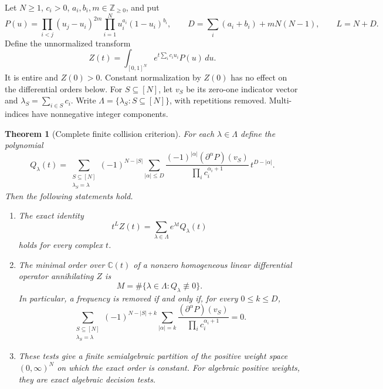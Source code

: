 \documentclass[11pt,a4paper]{article}
\newtheorem{theorem}{Theorem}[section]
\theoremstyle{definition}
\theoremstyle{remark}
\numberwithin{equation}{section}
\begin{document}
Let $N\ge1$, $c_i>0$, $a_i,b_i,m\in\mathbb Z_{\ge0}$, and put
\[
 P(u)=\prod_{i<j}(u_j-u_i)^{2m}
             \prod_{i=1}^N u_i^{a_i}(1-u_i)^{b_i},\qquad
 D=\sum_i(a_i+b_i)+mN(N-1),\qquad L=N+D.
\]
Define the unnormalized transform
\[
 Z(t)=\int_{[0,1]^N}e^{t\sum_i c_i u_i}P(u)\,du.
\]
It is entire and $Z(0)>0$.  Constant normalization by $Z(0)$ has no
effect on the differential orders below.  For $S\subseteq[N]$, let
$v_S$ be its zero-one indicator vector and $\lambda_S=\sum_{i\in S}c_i$.
Write $\Lambda=\{\lambda_S:S\subseteq[N]\}$, with repetitions removed.
Multi-indices have nonnegative integer components.

\begin{theorem}[Complete finite collision criterion]
\label{p9:thm:jc:criterion}
For each $\lambda\in\Lambda$ define the polynomial
\begin{equation}\label{p9:eq:jc:Q}
 Q_\lambda(t)=
 \sum_{\substack{S\subseteq[N]\\\lambda_S=\lambda}}
 (-1)^{N-|S|}
 \sum_{|\alpha|\le D}
 \frac{(-1)^{|\alpha|}(\partial^\alpha P)(v_S)}
      {\prod_i c_i^{\alpha_i+1}}\,t^{D-|\alpha|}.
\end{equation}
Then the following statements hold.
\begin{enumerate}
\item The exact identity
\begin{equation}\label{p9:eq:jc:exact}
 t^L Z(t)=\sum_{\lambda\in\Lambda}e^{\lambda t}Q_\lambda(t)
\end{equation}
holds for every complex $t$.
\item The minimal order over $\mathbb C(t)$ of a nonzero homogeneous
linear differential operator annihilating $Z$ is
\begin{equation}\label{p9:eq:jc:order}
 M=\#\{\lambda\in\Lambda:Q_\lambda\not\equiv0\}.
\end{equation}
In particular, a frequency is removed if and only if, for every
$0\le k\le D$,
\begin{equation}\label{p9:eq:jc:finite-test}
 \sum_{\substack{S\subseteq[N]\\\lambda_S=\lambda}}
 (-1)^{N-|S|+k}
 \sum_{|\alpha|=k}
 \frac{(\partial^\alpha P)(v_S)}{\prod_i c_i^{\alpha_i+1}}=0.
\end{equation}
\item These tests give a finite semialgebraic partition of the positive
weight space $(0,\infty)^N$ on which the exact order is constant.  For
algebraic positive weights, they are exact algebraic decision tests.
\end{enumerate}
\end{theorem}
\end{document}
